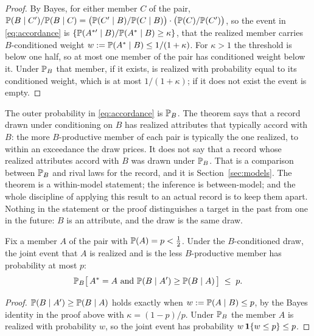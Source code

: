 \begin{proof}
By Bayes, for either member $C$ of the pair,
$\mathbb{P}(B\mid C')/\mathbb{P}(B\mid C)=\bigl(\mathbb{P}(C'\mid B)/\mathbb{P}(C\mid B)\bigr)\cdot
\bigl(\mathbb{P}(C)/\mathbb{P}(C')\bigr)$, so the event in \eqref{eq:accordance} is
$\{\mathbb{P}(A^{\ast\prime}\mid B)/\mathbb{P}(A^\ast\mid B)\ge\kappa\}$, that the
realized member carries $B$-conditioned weight $w:=\mathbb{P}(A^\ast\mid B)\le
1/(1+\kappa)$. For $\kappa>1$ the threshold is below one half, so at most
one member of the pair has conditioned weight below it. Under $\mathbb{P}_B$ that
member, if it exists, is realized with probability equal to its
conditioned weight, which is at most $1/(1+\kappa)$; if it does not exist
the event is empty.
\end{proof}

\begin{remark}
\label{rem:scope}
The outer probability in \eqref{eq:accordance} is $\mathbb{P}_B$. The theorem
says that a record drawn under conditioning on $B$ has realized
attributes that typically accord with $B$: the more $B$-productive member
of each pair is typically the one realized, to within an exceedance the
draw prices. It does not say that a record whose realized attributes
accord with $B$ was drawn under $\mathbb{P}_B$. That is a comparison between
$\mathbb{P}_B$ and rival laws for the record, and it is Section~\ref{sec:models}.
The theorem is a within-model statement; the inference is between-model;
and the whole discipline of applying this result to an actual record is
to keep them apart. Nothing in the statement or the proof distinguishes a
target in the past from one in the future: $B$ is an attribute, and the
draw is the same draw.
\end{remark}

\begin{corollary}\label{cor:prior}
Fix a member $A$ of the pair with $\mathbb{P}(A)=p<\tfrac12$. Under the
$B$-conditioned draw, the joint event that $A$ is realized and is the
less $B$-productive member has probability at most $p$:
\begin{equation}\label{eq:prior}
\mathbb{P}_B\bigl[\,A^\ast=A\ \text{and}\ \mathbb{P}(B\mid A')\ge\mathbb{P}(B\mid A)\,\bigr]\;\le\;p.
\end{equation}
\end{corollary}

\begin{proof}
$\mathbb{P}(B\mid A')\ge\mathbb{P}(B\mid A)$ holds exactly when $w:=\mathbb{P}(A\mid B)\le p$,
by the Bayes identity in the proof above with $\kappa=(1-p)/p$. Under
$\mathbb{P}_B$ the member $A$ is realized with probability $w$, so the joint
event has probability $w\,\mathbf{1}\{w\le p\}\le p$.
\end{proof}

